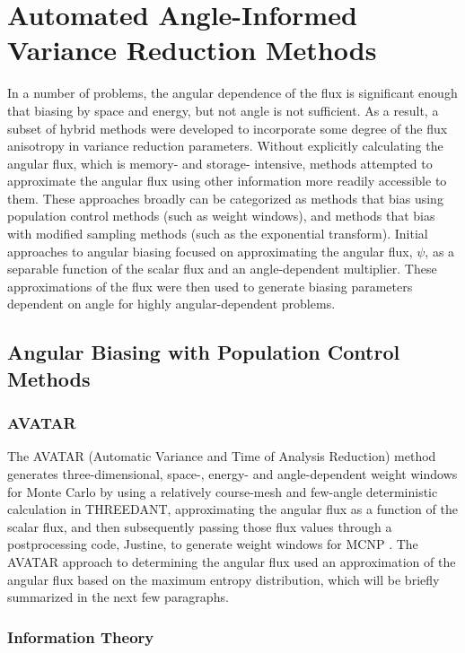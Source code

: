 \section{Automated Angle-Informed Variance Reduction Methods}
\label{sec:AngleVR}

In a number of problems, the angular dependence of the flux is significant enough that
biasing by space and energy, but not angle  is not
sufficient. As a result, a subset of hybrid methods were developed to incorporate some
degree of the flux anisotropy in variance reduction parameters. Without explicitly
calculating the angular flux, which is memory- and storage- intensive, methods
attempted to approximate the angular flux using other information more readily
accessible to them. These approaches broadly can be categorized as methods that
bias using population control methods (such as weight windows),
and methods that bias with modified
sampling methods (such as the exponential transform).
Initial approaches
to angular biasing focused on approximating the angular flux, $\psi$,
as a separable
function of the scalar flux and an angle-dependent multiplier.
These approximations of the flux were then used to generate biasing
parameters dependent on angle for highly angular-dependent problems.

\subsection{Angular Biasing with Population Control Methods}

\subsubsection{AVATAR}

The AVATAR \cite{van_riper_generation_1995, van_riper_avatarautomatic_1997}
(Automatic Variance and Time of Analysis Reduction) method generates
three-dimensional, space-, energy- and angle-dependent weight windows for Monte
Carlo by
using a relatively course-mesh and few-angle deterministic calculation in
THREEDANT, approximating the angular flux as a function of the scalar flux, and
then subsequently passing those flux values through a postprocessing
code, Justine, to generate
weight windows for MCNP \cite{mcnp_manual_v1}. The AVATAR approach to
determining the angular flux used an approximation of the angular flux based on
the maximum entropy distribution, which will be briefly summarized in the next
few paragraphs.

\subsubsection*{Information Theory}

